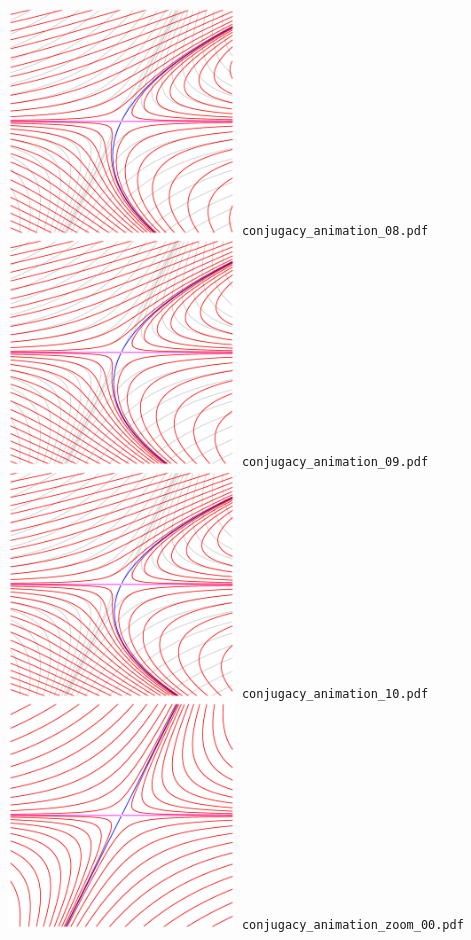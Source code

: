 \documentclass[a4paper]{amsart}
\begin{document}
\includegraphics[width=6cm]{conjugacy_animation_08.pdf}\verb+ conjugacy_animation_08.pdf+\\
\includegraphics[width=6cm]{conjugacy_animation_09.pdf}\verb+ conjugacy_animation_09.pdf+\\
\includegraphics[width=6cm]{conjugacy_animation_10.pdf}\verb+ conjugacy_animation_10.pdf+\\
\includegraphics[width=6cm]{conjugacy_animation_zoom_00.pdf}\verb+ conjugacy_animation_zoom_00.pdf+\\
\end{document}
